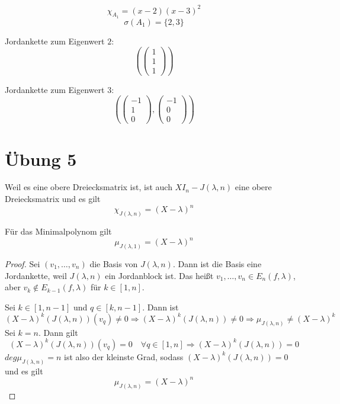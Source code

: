 \documentclass[10pt,a4paper]{article}
\begin{document}
\begin{equation}
\chi_{A_{1}} = (x - 2)(x - 3)^{2}
\end{equation}
\begin{equation}
\sigma(A_{1}) = \{2, 3\}
\end{equation}

Jordankette zum Eigenwert $2$:
\begin{equation}
\left(
\begin{pmatrix}
1\\1\\1
\end{pmatrix}
\right)
\end{equation}

Jordankette zum Eigenwert $3$:
\begin{equation}
\left(
\begin{pmatrix}
-1\\1\\0
\end{pmatrix},
\begin{pmatrix}
-1\\0\\0
\end{pmatrix}
\right)
\end{equation}

\section*{Übung 5}

Weil es eine obere Dreiecksmatrix ist, ist auch $XI_{n} - J(\lambda, n)$ eine obere Dreiecksmatrix und es gilt
\begin{equation}
\chi_{J(\lambda, n)} = (X - \lambda)^{n}
\end{equation}

Für das Minimalpolynom gilt
\begin{equation}
\mu_{J(\lambda, 1)} = (X - \lambda)^{n}
\end{equation}

\begin{proof}
Sei $(v_{1}, \dots, v_{n})$ die Basis von $J(\lambda, n)$.
Dann ist die Basis eine Jordankette, weil $J(\lambda, n)$ ein Jordanblock ist.
Das heißt $v_{1}, \dots, v_{n} \in E_{n}(f, \lambda)$, aber $v_{k} \notin E_{k - 1}(f, \lambda)$ für $k \in [1, n]$.

Sei $k \in [1, n - 1]$ und $q \in [k, n - 1]$.
Dann ist
\begin{equation}
(X - \lambda)^{k}(J(\lambda, n))(v_{q}) \ne 0 \Rightarrow (X - \lambda)^{k}(J(\lambda, n)) \ne 0 \Rightarrow \mu_{J(\lambda, n)} \ne (X - \lambda)^{k}
\end{equation}
Sei $k = n$.
Dann gilt
\begin{equation}
(X - \lambda)^{k}(J(\lambda, n))(v_{q}) = 0 \quad \forall q \in [1, n] \Rightarrow (X - \lambda)^{k}(J(\lambda, n)) = 0
\end{equation}
$deg \mu_{J(\lambda, n)} = n$ ist also der kleinste Grad, sodass $(X - \lambda)^{k}(J(\lambda, n)) = 0$ und es gilt
\begin{equation}
\mu_{J(\lambda, n)} = (X - \lambda)^{n}
\end{equation}
\end{proof}
\end{document}
